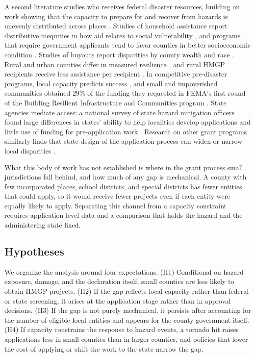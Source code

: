\documentclass[12pt]{article}
\begin{document}
A second literature studies who receives federal disaster resources, building on work showing that the capacity to prepare for and recover from hazards is unevenly distributed across places \parencite{cutter2003sovi,cutter2008temporal}. Studies of household assistance report distributive inequities in how aid relates to social vulnerability \parencite{drakes2021social,emrich2022distributive}, and programs that require government applicants tend to favor counties in better socioeconomic condition \parencite{miao2025equity}. Studies of buyouts report disparities by county wealth and race \parencite{mach2019buyouts,elliott2020racial}. Rural and urban counties differ in measured resilience \parencite{cutter2016urbanrural}, and rural HMGP recipients receive less assistance per recipient \parencite{seong2022naturally}. In competitive pre-disaster programs, local capacity predicts success \parencite{smith2025rural}, and small and impoverished communities obtained 29\% of the funding they requested in FEMA's first round of the Building Resilient Infrastructure and Communities program \parencite{headwaters_nd}. State agencies mediate access: a national survey of state hazard mitigation officers found large differences in states' ability to help localities develop applications and little use of funding for pre-application work \parencite{smith2020state,vila2022equity}. Research on other grant programs similarly finds that state design of the application process can widen or narrow local disparities \parencite{collins2006redistributive,collins2008taken}.

What this body of work has not established is where in the grant process small jurisdictions fall behind, and how much of any gap is mechanical. A county with few incorporated places, school districts, and special districts has fewer entities that could apply, so it would receive fewer projects even if each entity were equally likely to apply. Separating this channel from a capacity constraint requires application-level data and a comparison that holds the hazard and the administering state fixed.

\subsection{Hypotheses}

We organize the analysis around four expectations. (H1) Conditional on hazard exposure, damage, and the declaration itself, small counties are less likely to obtain HMGP projects. (H2) If the gap reflects local capacity rather than federal or state screening, it arises at the application stage rather than in approval decisions. (H3) If the gap is not purely mechanical, it persists after accounting for the number of eligible local entities and appears for the county government itself. (H4) If capacity constrains the response to hazard events, a tornado hit raises applications less in small counties than in larger counties, and policies that lower the cost of applying or shift the work to the state narrow the gap.
\end{document}
